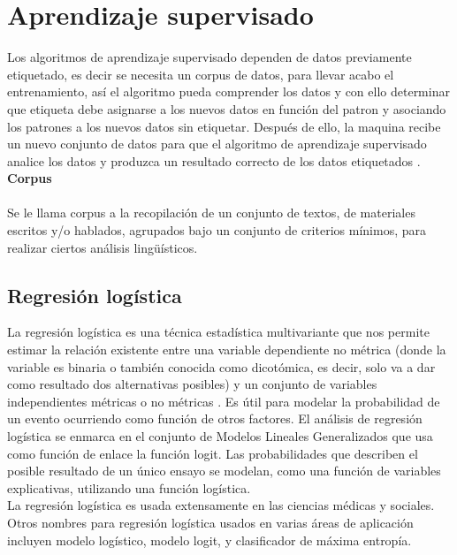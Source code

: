 \section{Aprendizaje supervisado}

Los algoritmos de aprendizaje supervisado dependen de datos previamente etiquetado, es decir se necesita un corpus de datos, para llevar acabo el entrenamiento, así 
el algoritmo pueda comprender los datos y con ello determinar que etiqueta debe asignarse a los nuevos datos 
en función del patron y asociando los patrones a los nuevos datos sin etiquetar. Después de ello, la maquina recibe 
un nuevo conjunto de datos para que el algoritmo de aprendizaje supervisado analice los datos y produzca un resultado 
correcto de los datos etiquetados \citep{CT4}.\\

\textbf{Corpus}\\\\

Se le llama corpus a la recopilación de un conjunto de textos, de materiales escritos y/o hablados, 
agrupados bajo un conjunto de criterios mínimos, para realizar ciertos análisis lingüísticos.



\subsection{Regresión logística}

La regresión logística es una técnica estadística multivariante que nos permite estimar la relación existente entre una variable dependiente 
no métrica (donde la variable es binaria o también conocida como dicotómica, es decir, solo va a dar como resultado dos alternativas posibles) 
y un conjunto de variables independientes métricas o no métricas \citep{CT6}. Es útil para modelar la probabilidad de un evento ocurriendo como 
función de otros factores. El análisis de regresión logística se enmarca en el conjunto de Modelos Lineales Generalizados que usa como función de 
enlace la función logit. Las probabilidades que describen el posible resultado de un único ensayo se modelan, como una función de variables explicativas, 
utilizando una función logística.\\

La regresión logística es usada extensamente en las ciencias médicas y sociales. Otros nombres para regresión logística usados en varias áreas de 
aplicación incluyen modelo logístico, modelo logit, y clasificador de máxima entropía.

